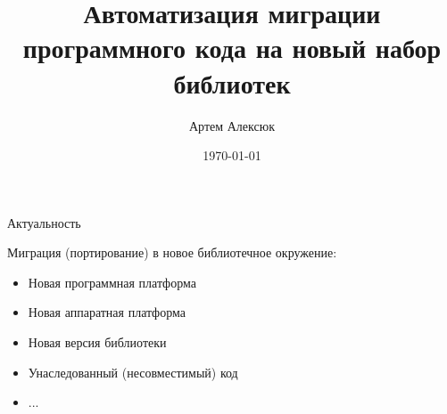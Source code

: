 \documentclass[12pt]{beamer}
\title{Автоматизация миграции программного кода на новый набор библиотек}
\date{\today}
\author{Артем Алексюк}
\institute{Санкт-Петербургский политехнический университет Петра Великого \\
JetBrains Research}
\begin{document}
\maketitle




{
\begin{frame}{Актуальность}
\begin{mybox}[]
Миграция (портирование) в новое библиотечное окружение:
\begin{itemize}
	\item Новая программная платформа
	\item Новая аппаратная платформа
	\item Новая версия библиотеки
	\item Унаследованный (несовместимый) код 
	\item ...		
\end{itemize}
\end{mybox}
\end{frame}
}
\end{document}
